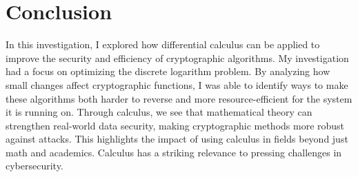 \documentclass[12pt]{article}
\begin{document}
\section{Conclusion}
In this investigation, I explored how differential calculus can be applied to improve the security and efficiency of cryptographic algorithms.  My investigation had a focus on optimizing the discrete logarithm problem. By analyzing how small changes affect cryptographic functions, I was able to identify ways to make these algorithms both harder to reverse and more resource-efficient for the system it is running on. Through calculus, we see that mathematical theory can strengthen real-world data security, making cryptographic methods more robust against attacks. This highlights the impact of using calculus in fields beyond just math and academics. Calculus has a striking relevance to pressing challenges in cybersecurity.

\newpage
\end{document}
